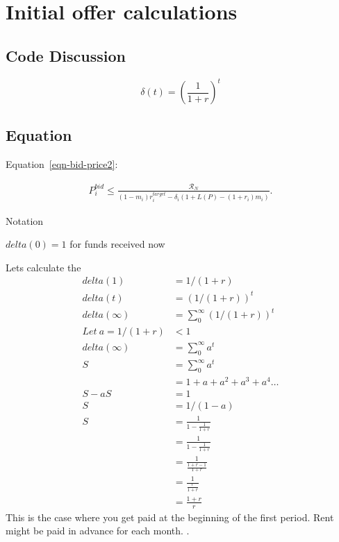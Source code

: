 \chapter{Initial offer calculations}
\section{Code Discussion}


\[\delta(t)=\left(\frac{1}{1+r}\right)^t\]



    
\section{Equation}
Equation~\ref{eqn-bid-price2}:


\begin{align}
P_i^{bid} \le   \frac{\mathcal{R}_N}{(1-m_i)r_i^{target}- \delta_i \left(1+L(P)- (1+ r_i)m_i\right)}.
\end{align}

Notation

$delta(0)=1$  for funds received now

Lets calculate the
\begin{align}
delta (1)   &= 1/(1+r) \\
delta (t)   &= (1/(1+r))^t \\
delta (\infty)   &= \sum_0^\infty\left(1/(1+r)\right)^t\\ 
Let\ a=1/(1+r)&<1\\
delta (\infty)   &= \sum_0^\infty a^t\\ 
S               &= \sum_0^\infty a^t\\ 
               &= 1+a+a^2+a^3+a^4 \dots\\ 
S-aS             &= 1\\ 
S             &= 1/(1-a)\\ 
S             &= \frac{1}{1-\frac{1}{1+r}}\\ 
             &= \frac{1}{1-\frac{1}{1+r}}\\ 
             &= \frac{1}{\frac{1+r-1}{1+r}}\\ 
              &= \frac{1}{\frac{r}{1+r}}\\ 
             &= \frac{1+r}{r}
\end{align}
This is the case where you get paid at the beginning of the first period. Rent might be paid in advance for each month. .

